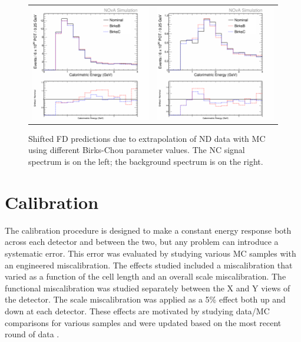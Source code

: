 \begin{figure}[htb]
  \centering
  \begin{tabular}{c c}
    \includegraphics[width=.47\textwidth]{figures/Systs/cNCEXBirksSysts.png} &
    \includegraphics[width=.47\linewidth]{figures/Systs/cBGEXBirksSysts.png} \\
  \end{tabular}
  \caption[Birks-Chou Shifted FD Predictions]{Shifted FD predictions due to extrapolation of ND data with MC using different Birks-Chou parameter values. The NC signal spectrum is on the left; the background spectrum is on the right.}
  \label{fig:SystBirks}
\end{figure}

\section{Calibration}
\label{sec:SystCalib}

The calibration procedure is designed to make a constant energy response both across each detector and between the two, but any problem can introduce a systematic error. This error was evaluated by studying various MC samples with an engineered miscalibration. The effects studied included a miscalibration that varied as a function of the cell length and an overall scale miscalibration. The functional miscalibration was studied separately between the X and Y views of the detector. The scale miscalibration was applied as a 5\% effect both up and down at each detector. These effects are motivated by studying data/MC comparisons for various samples \cite{ref:TNCalib, ref:CalibMESA, ref:CalibPi0SA} and were updated based on the most recent round of data \cite{ref:CalibSA}.

